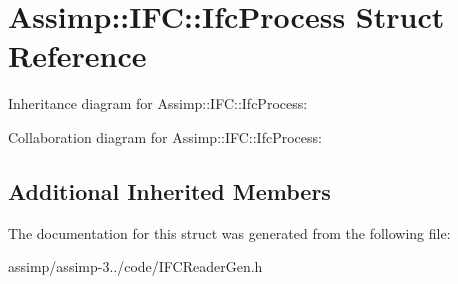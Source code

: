 \hypertarget{struct_assimp_1_1_i_f_c_1_1_ifc_process}{\section{Assimp\+:\+:I\+F\+C\+:\+:Ifc\+Process Struct Reference}
\label{struct_assimp_1_1_i_f_c_1_1_ifc_process}
}


Inheritance diagram for Assimp\+:\+:I\+F\+C\+:\+:Ifc\+Process\+:


Collaboration diagram for Assimp\+:\+:I\+F\+C\+:\+:Ifc\+Process\+:
\subsection*{Additional Inherited Members}


The documentation for this struct was generated from the following file\+:\begin{DoxyCompactItemize}
\item 
assimp/assimp-\/3../code/I\+F\+C\+Reader\+Gen.\+h\end{DoxyCompactItemize}
